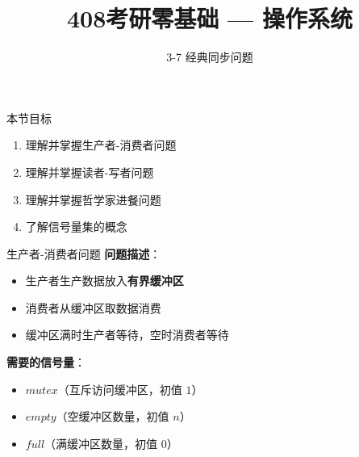 \documentclass[10pt, aspectratio=169]{beamer}
\title{408考研零基础 --- 操作系统}
\subtitle{3-7 经典同步问题}
\author{}
\date{}
\begin{document}
\begin{frame}{本节目标}
    \begin{enumerate}
        \item 理解并掌握生产者-消费者问题
        \item 理解并掌握读者-写者问题
        \item 理解并掌握哲学家进餐问题
        \item 了解信号量集的概念
    \end{enumerate}
\end{frame}

\begin{frame}{生产者-消费者问题}
    \textbf{问题描述}：
    \begin{itemize}
        \item 生产者生产数据放入\textbf{有界缓冲区}
        \item 消费者从缓冲区取数据消费
        \item 缓冲区满时生产者等待，空时消费者等待
    \end{itemize}
    \vspace{0.5em}
    \textbf{需要的信号量}：
    \begin{itemize}
        \item $mutex$（互斥访问缓冲区，初值 $1$）
        \item $empty$（空缓冲区数量，初值 $n$）
        \item $full$（满缓冲区数量，初值 $0$）
    \end{itemize}
\end{frame}
\end{document}
